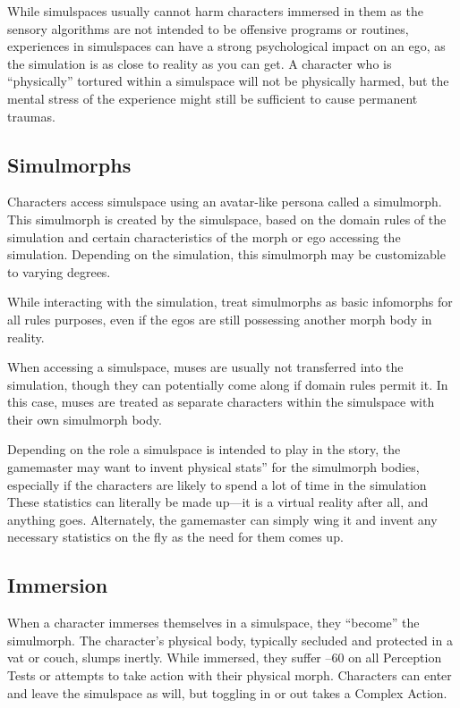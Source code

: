 While simulspaces usually cannot harm characters 
immersed in them as the sensory algorithms are not 
intended to be offensive programs or routines, experiences
in simulspaces can have a strong psychological
impact on an ego, as the simulation is as close to 
reality as you can get. A character who is ``physically'' 
tortured within a simulspace will not be physically 
harmed, but the mental stress of the experience might 
still be sufficient to cause permanent traumas.

\subsection{Simulmorphs}

Characters access simulspace using an avatar-like persona
called a simulmorph. This simulmorph is created by
the simulspace, based on the domain rules of the simulation
and certain characteristics of the morph or ego
accessing the simulation. Depending on the simulation, 
this simulmorph may be customizable to varying degrees.

While interacting with the simulation, treat simulmorphs
as basic infomorphs for all rules purposes,
even if the egos are still possessing another morph 
body in reality.

When accessing a simulspace, muses are usually not 
transferred into the simulation, though they can potentially
come along if domain rules permit it. In this
case, muses are treated as separate characters within 
the simulspace with their own simulmorph body.

Depending on the role a simulspace is intended to play 
in the story, the gamemaster may want to invent physical
stats'' for the simulmorph bodies, especially if the
characters are likely to spend a lot of time in the simulation
These statistics can literally be made up—it is a virtual
reality after all, and anything goes. Alternately, the
gamemaster can simply wing it and invent any necessary 
statistics on the fly as the need for them comes up.

\subsection{Immersion}

When a character immerses themselves in a simulspace, 
they ``become'' the simulmorph. The character's physical
body, typically secluded and protected in a vat or
couch, slumps inertly. While immersed, they suffer –60 
on all Perception Tests or attempts to take action with 
their physical morph. Characters can enter and leave 
the simulspace as will, but toggling in or out takes a 
Complex Action.

